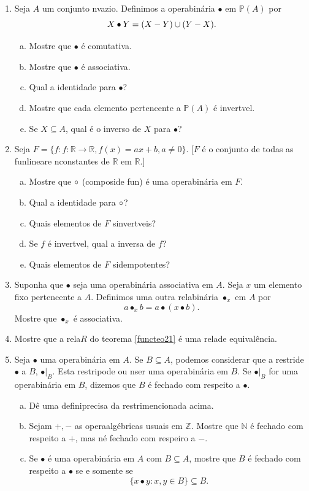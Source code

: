 \begin{enumerate}[{\bf 1.}]
\item Seja $A$ um conjunto n\ao vazio. Definimos a opera\cao bin\'aria $\bullet$ em $\mathbb{P}(A)$ por
\[
X\bullet Y=(X-Y)\cup(Y-X).
\]
\begin{enumerate}[a)]
\item Mostre que $\bullet$ \'e comutativa.
\item Mostre que $\bullet$ \'e associativa.
\item Qual a identidade para $\bullet$?
\item Mostre que cada elemento pertencente a $\mathbb{P}(A)$ \'e invert\ih vel.
\item Se $X\subseteq A$, qual \'e o inverso de $X$ para $\bullet$? 
\end{enumerate}

\item Seja $F=\{f: f:\mathbb{R}\to\mathbb{R}, f(x)=ax+b, a\neq 0\}$. [$F$ \'e o conjunto de todas as fun\coes lineare n\ao constantes de $\mathbb{R}$ em $\mathbb{R}$.]
\begin{enumerate}[a)]
\item Mostre que $\circ$ (composi\cao de fun\cois) \'e uma opera\cao bin\'aria em $F$.
\item Qual a identidade para $\circ$?
\item Quais elementos de $F$ s\ao invert\ih veis?
\item Se $f$ \'e invert\ih vel, qual a inversa de $f$?
\item Quais elementos de $F$ s\ao idempotentes? 
\end{enumerate}

\item Suponha que $\bullet$ seja uma opera\cao bin\'aria associativa em $A$. Seja $x$ um elemento fixo pertencente a $A$. Definimos uma outra rela\cao bin\'aria $\bullet_x$ em $A$ por
\[
a\bullet_x b=a\bullet(x\bullet b).
\]
Mostre que $\bullet_x$ \'e associativa.

\item Mostre que a rela\cao $R$ do teorema \ref{functeo21} \'e uma rela\cao de equival\^encia.

\item Seja $\bullet$ uma opera\cao bin\'aria em $A$. Se $B\subseteq A$, podemos considerar que a restri\cao de $\bullet$ a $B$, $\bullet|_B$. Esta restri\cao pode ou n\ao ser uma opera\cao bin\'aria em $B$. Se $\bullet|_B$ for uma opera\cao bin\'aria em $B$, dizemos que $B$ \'e fechado com respeito a $\bullet$. 
\begin{enumerate}[a)]
\item D\^e uma defini\cao precisa da restri\cao mencionada acima.
\item Sejam $+,-$ as opera\coes alg\'ebricas usuais em $\mathbb{Z}$. Mostre que $\mathbb{N}$ \'e fechado com respeito a $+$, mas n\ao \'e fechado com respeiro a $-$.
\item Se $\bullet$ \'e uma opera\cao bin\'aria em $A$ com $B\subseteq A$, mostre que $B$ \'e fechado com respeito a $\bullet$ se e somente se 
\[
\{x\bullet y: x,y\in B\}\subseteq B.
\]
\end{enumerate}


\end{enumerate}
